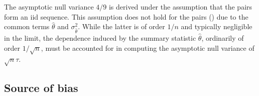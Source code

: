 \documentclass[12pt]{article}
\newcommand{\thetahat}{\hat{\theta}}
\begin{document}
    The asymptotic null variance $4/9$ is derived under the assumption
    that the pairs form an iid sequence. This assumption does not hold
    for the pairs () due to the common terms
    $\hat{\theta}$ and $\sigma^2_{\hat{\theta}}$. While the latter is
    of order $1/n$ and typically negligible in the limit, the
    dependence induced by the summary statistic $\thetahat$,
    ordinarily of order $1/\sqrt{n}$, must be accounted for in
    computing the asymptotic null variance of $\sqrt{n}\tau$.
    
    
  \subsection{Source of bias}\label{section:theory:source of bias}
  
\end{document}
